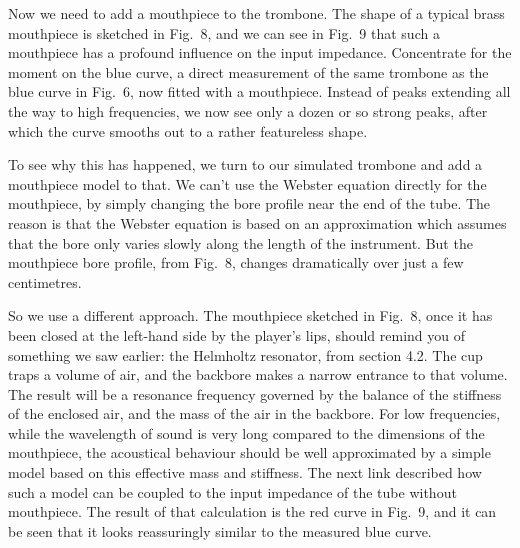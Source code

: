   Now we need to add a mouthpiece to the trombone. The shape of a typical brass 
  mouthpiece is sketched in Fig.\ 8, and we can see in Fig.\ 9 that such a 
  mouthpiece has a profound influence on the input impedance. Concentrate for 
  the moment on the blue curve, a direct measurement of the same trombone as 
  the blue curve in Fig.\ 6, now fitted with a mouthpiece. Instead of peaks 
  extending all the way to high frequencies, we now see only a dozen or so 
  strong peaks, after which the curve smooths out to a rather featureless 
  shape. 



  To see why this has happened, we turn to our simulated trombone and add a 
  mouthpiece model to that. We can’t use the Webster equation directly for the 
  mouthpiece, by simply changing the bore profile near the end of the tube. The 
  reason is that the Webster equation is based on an approximation which 
  assumes that the bore only varies slowly along the length of the instrument. 
  But the mouthpiece bore profile, from Fig.\ 8, changes dramatically over just 
  a few centimetres. 

  So we use a different approach. The mouthpiece sketched in Fig.\ 8, once it 
  has been closed at the left-hand side by the player’s lips, should remind you 
  of something we saw earlier: the Helmholtz resonator, from section 4.2. The 
  cup traps a volume of air, and the backbore makes a narrow entrance to that 
  volume. The result will be a resonance frequency governed by the balance of 
  the stiffness of the enclosed air, and the mass of the air in the backbore. 
  For low frequencies, while the wavelength of sound is very long compared to 
  the dimensions of the mouthpiece, the acoustical behaviour should be well 
  approximated by a simple model based on this effective mass and stiffness. 
  The next link described how such a model can be coupled to the input 
  impedance of the tube without mouthpiece. The result of that calculation is 
  the red curve in Fig.\ 9, and it can be seen that it looks reassuringly 
  similar to the measured blue curve. 

